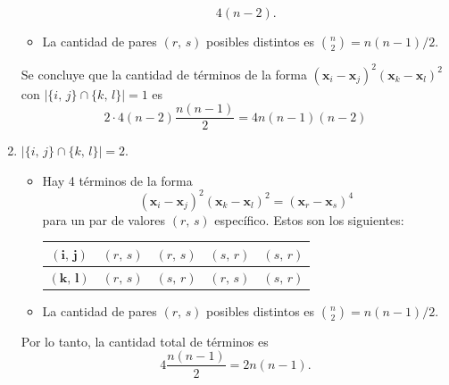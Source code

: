 \documentclass[a4paper]{report}
\newcommand{\x}{\mathbf{x}}
\begin{document}
\begin{enumerate}
\begin{itemize}
  \[
   4(n-2).
  \]
  \item La cantidad de pares \((r,\,s)\) posibles distintos es \(\binom{n}{2}=n(n-1)/2\).
 \end{itemize}
Se concluye que la cantidad de términos de la forma \((\x_i-\x_j)^2(\x_k-\x_l)^2\) con \(|\{i,\,j\}\cap\{k,\,l\}|=1\) es
\[
 2\cdot4(n-2)\frac{n(n-1)}{2}=4n(n-1)(n-2)
\]
\item \(|\{i,\,j\}\cap\{k,\,l\}|=2\). 
\begin{itemize}
 \item Hay 4 términos de la forma
\[
 (\x_i-\x_j)^2(\x_k-\x_l)^2=(\x_r-\x_s)^4
\]
para un par de valores \((r,\,s)\) específico. Estos son los siguientes:
\bgroup
\def\arraystretch{1.2}
\begin{center}
  \begin{tabular}{| c | c | c | c | c |}
    \hline
    \(\bm{(i,\,j)}\) & \((r,\,s)\) & \((r,\,s)\) & \((s,\,r)\) & \((s,\,r)\) \\ \hline
    \(\bm{(k,\,l)}\) & \((r,\,s)\) & \((s,\,r)\) & \((r,\,s)\) & \((s,\,r)\) \\ \hline
  \end{tabular}
\end{center}
\egroup
\item La cantidad de pares \((r,\,s)\) posibles distintos es \(\binom{n}{2}=n(n-1)/2\).
\end{itemize}
Por lo tanto, la cantidad total de términos es
\[
 4\frac{n(n-1)}{2}=2n(n-1).
\]
\end{enumerate}
\end{document}
